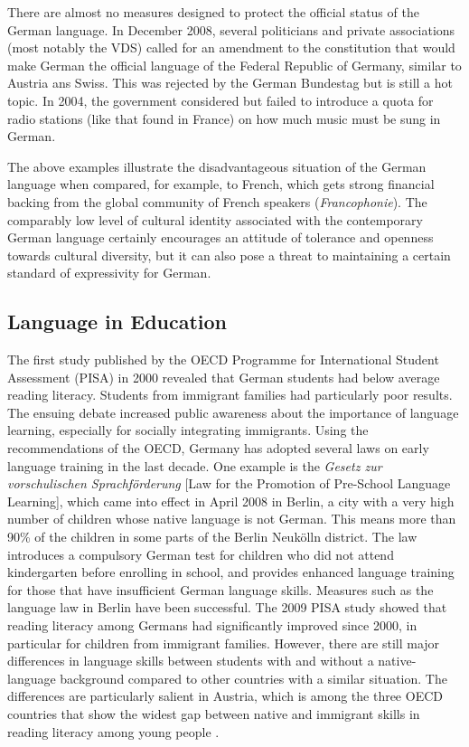 \begin{multicols}{2}
There are almost no measures designed to protect the official status of the German language. In December 2008, several politicians and private associations (most notably the VDS) called for an amendment to the constitution that would make German the official language of the Federal Republic of Germany, similar to Austria ans Swiss. This was rejected by the German Bundestag but is still a hot topic. In 2004, the government considered but failed to introduce a quota for radio stations (like that found in France) on how much music must be sung in German. 

The above examples illustrate the disadvantageous situation of the German language when compared, for example, to French, which gets strong financial backing from the global community of French speakers (\textit{Francophonie}). The comparably low level of cultural identity associated with the contemporary German language certainly encourages an attitude of tolerance and openness towards cultural diversity, but it can also pose a threat to maintaining a certain standard of expressivity for German.

\subsection{Language in Education}

The first study published by the OECD Programme for International Student Assessment (PISA) in 2000 revealed that German students had below average reading literacy. Students from immigrant families had particularly poor results. The ensuing debate increased public awareness about the importance of language learning, especially for socially integrating immigrants. Using the recommendations of the OECD, Germany has adopted several laws on early language training in the last decade. One example is the \textit{Gesetz zur vorschulischen Sprachförderung} [Law for the Promotion of Pre-School Language Learning], which came into effect in April 2008 in Berlin, a city with a very high number of children whose native language is not German. This means more than 90\% of the children in some parts of the Berlin Neukölln district. The law introduces a compulsory German test for children who did not attend kindergarten before enrolling in school, and provides enhanced language training for those that have insufficient German language skills. Measures such as the language law in Berlin have been successful. The 2009 PISA study showed that reading literacy among Germans had significantly improved since 2000, in particular for children from immigrant families. However, there are still major differences in language skills between students with and without a native-language background compared to other countries with a similar situation. The differences are particularly salient in Austria, which is among the three OECD countries that show the widest gap between native and immigrant skills in reading literacy among young people \cite{Pisa1}.


\end{multicols}
